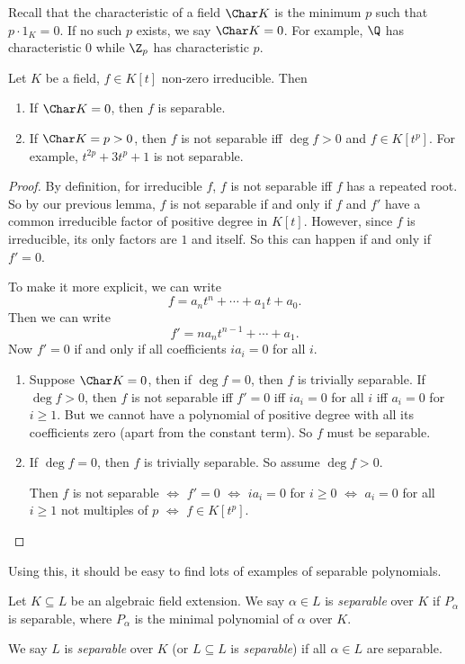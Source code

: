 \documentclass[a4paper]{article}
\begin{document}
Recall that the characteristic of a field $\Char K$ is the minimum $p$ such that $p \cdot 1_K = 0$. If no such $p$ exists, we say $\Char K = 0$. For example, $\Q$ has characteristic $0$ while $\Z_p$ has characteristic $p$.
\begin{cor}
  Let $K$ be a field, $f \in K[t]$ non-zero irreducible. Then
  \begin{enumerate}
    \item If $\Char K = 0$, then $f$ is separable.
    \item If $\Char K = p > 0$, then $f$ is not separable iff $\deg f > 0$ and $f \in K[t^p]$.  For example, $t^{2p} + 3t^p + 1$ is not separable.
  \end{enumerate}
\end{cor}
\begin{proof}
  By definition, for irreducible $f$, $f$ is not separable iff $f$ has a repeated root. So by our previous lemma, $f$ is not separable if and only if $f$ and $f'$ have a common irreducible factor of positive degree in $K[t]$. However, since $f$ is irreducible, its only factors are $1$ and itself. So this can happen if and only if $f' = 0$.

  To make it more explicit, we can write
  \[
    f = a_n t^n + \cdots + a_1 t + a_0.
  \]
  Then we can write
  \[
    f' = n a_n t^{n - 1} + \cdots + a_1.
  \]
  Now $f' = 0$ if and only if all coefficients $i a_i = 0$ for all $i$.
  \begin{enumerate}
    \item Suppose $\Char K = 0$, then if $\deg f = 0$, then $f$ is trivially separable. If $\deg f > 0$, then $f$ is not separable iff $f' = 0$ iff $i a_i = 0$ for all $i$ iff $a_i = 0$ for $i \geq 1$. But we cannot have a polynomial of positive degree with all its coefficients zero (apart from the constant term). So $f$ must be separable.
    \item If $\deg f = 0$, then $f$ is trivially separable. So assume $\deg f > 0$.

      Then $f$ is not separable $\Leftrightarrow$ $f' = 0$ $\Leftrightarrow$ $i a_i = 0$ for $i \geq 0$ $\Leftrightarrow$ $a_i = 0$ for all $i \geq 1$ not multiples of $p$ $\Leftrightarrow$ $f \in K[t^p]$.
  \end{enumerate}
\end{proof}
Using this, it should be easy to find lots of examples of separable polynomials.

\begin{defi}
  Let $K \subseteq L$ be an algebraic field extension. We say $\alpha \in L$ is \emph{separable} over $K$ if $P_\alpha$ is separable, where $P_\alpha$ is the minimal polynomial of $\alpha$ over $K$.

  We say $L$ is \emph{separable} over $K$ (or $L\subseteq L$ is \emph{separable}) if all $\alpha \in L$ are separable.
\end{defi}
\end{document}
